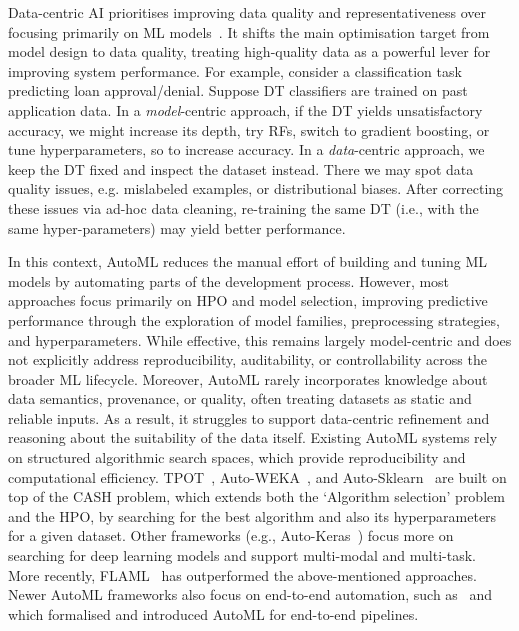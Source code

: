\documentclass[runningheads]{llncs}
\begin{document}
Data-centric \ac{AI} prioritises improving data quality and representativeness over focusing primarily on \ac{ML} models~\cite{zha2025data}.
%
It shifts the main optimisation target from model design to data quality,
treating high-quality data as a powerful lever for improving system performance.
%
For example,
consider a classification task predicting loan approval/denial.
%
Suppose \ac{DT} classifiers are trained on past application data.
%
In a \emph{model}-centric approach,
if the \ac{DT} yields unsatisfactory accuracy,
we might increase its depth,
try \acp{RF},
switch to gradient boosting,
or tune hyperparameters,
so to increase accuracy.
%
In a \emph{data}-centric approach,
we keep the \ac{DT} fixed and inspect the dataset instead.
%
There we may spot data quality issues,
e.g. mislabeled examples,
or distributional biases.
%
After correcting these issues via ad-hoc data cleaning, %
re-training the same \ac{DT} (i.e., with the same hyper-parameters) may yield better performance.

In this context, \Ac{AutoML} reduces the manual effort of building and tuning \ac{ML} models by automating parts of the development process.
%
However, most approaches focus primarily on \ac{HPO} and model selection,
improving predictive performance through the exploration of model families, preprocessing strategies, and hyperparameters.
%
While effective, this remains largely model-centric and does not explicitly address reproducibility, auditability, or controllability across the broader \ac{ML} lifecycle.
%
Moreover, \ac{AutoML} rarely incorporates knowledge about data semantics, provenance, or quality,
often treating datasets as static and reliable inputs.
%
As a result, it struggles to support data-centric refinement and reasoning about the suitability of the data itself.
%
Existing \ac{AutoML} systems rely on structured algorithmic search spaces,
which provide reproducibility and computational efficiency.
%
%
TPOT~\cite{olson2016tpot},
Auto-WEKA~\cite{DBLP:conf/kdd/ThorntonHHL13},
and
Auto-Sklearn~\cite{DBLP:journals/jmlr/FeurerEFLH22}
are built on top of the \ac{CASH} problem,
which extends both the `Algorithm selection' problem
and
the \ac{HPO},
by searching for the best algorithm and also its hyperparameters for a given dataset.
%
Other frameworks
(e.g., Auto-Keras~\cite{DBLP:conf/kdd/JinSH19})
focus more on searching for deep learning models and support multi-modal and multi-task.
%
More recently,
FLAML~\cite{DBLP:conf/kdd/0001W0Q22} has outperformed the above-mentioned approaches.
%
Newer \ac{AutoML} frameworks also focus on end-to-end automation,
such as~\cite{FranciaGP23} and~\cite{DBLP:conf/pakdd/FranciaGG24}
which formalised and introduced \ac{AutoML} for end-to-end pipelines.
\end{document}
